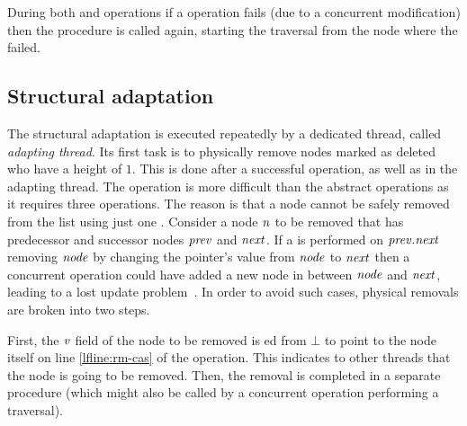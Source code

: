 During both  and  operations if a \CAS{} operation fails (due to a concurrent modification) then the  procedure is called again,
starting the traversal from the node where the \CAS{} failed.


\subsection{Structural adaptation}\label{sec:adap}

The structural adaptation is executed repeatedly by a dedicated thread, called \emph{adapting thread}.
Its first task is to physically remove nodes marked as deleted
who have a height of $1$.
This is done after a successful  operation, as well as in the adapting thread.
The  operation is more difficult than the abstract operations as it requires three \CAS{} operations.
The reason is that a node cannot be safely removed from the list using just one \CAS{}.
Consider a node $\ms{n}$ to be removed that has predecessor and successor nodes $\ms{prev}$ and $\ms{next}$.
If a \CAS{} is performed on $\ms{prev.next}$ removing $\ms{node}$ by changing the pointer's value from $\ms{node}$ to $\ms{next}$ then
a concurrent  operation could have added a new node in between $\ms{node}$ and $\ms{next}$, leading to a lost update problem~\cite{Val96}.
In order to avoid such cases, physical removals are broken into two steps.

First, the $\ms{v}$ field of the node to be removed is \CAS{}ed from $\bot$ to point to the node itself
on line \ref{lfline:rm-cas} of the  operation.
This indicates to other threads that the node is going to be removed.
Then, the removal is completed in a separate  procedure
(which might also be called by a concurrent operation performing a traversal).

